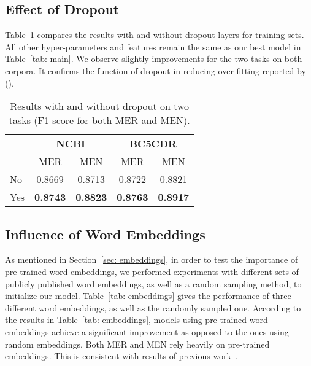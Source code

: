 \subsection{Effect of Dropout}
Table~\ref{tab: dropout} compares the results with and without dropout layers for training sets. All other
hyper-parameters and features remain the same as our best model in Table~\ref{tab: main}.
We observe slightly improvements for the two
tasks on both corpora. It confirms the function of dropout in reducing over-fitting reported by \citeauthor{Srivastava2014Dropout} (\citeyear{Srivastava2014Dropout}).
\begin{table}[h]
	\small
	\centering
	\begin{tabular}{l|c|c|c|c}
		\hline
		\multirow{2}{*}{}&\multicolumn{2}{c|}{\textbf{NCBI}}&\multicolumn{2}{c}{\textbf{BC5CDR}}\\
		\cline{2-5}
		\multirow{2}{*}{}& MER&MEN&MER&MEN\\
		\hline
		No&0.8669&0.8713&0.8722&0.8821\\
		Yes &\textbf{0.8743}&\textbf{0.8823}&\textbf{0.8763}&\textbf{0.8917}\\
		\hline
	\end{tabular}
	\vspace{-0.1in}
	\caption{Results with and without dropout on two
		tasks (F1 score for both MER and MEN).}\label{tab: dropout}	
	\vspace{-0.2in}
\end{table}

\subsection{Influence of Word Embeddings}
As mentioned in Section~\ref{sec: embeddings}, in order to test the importance of pre-trained word embeddings, we performed experiments with different sets of publicly published word embeddings, as well as a random sampling method, to initialize our model. Table~\ref{tab: embeddings} gives the performance of three different word embeddings, as well as the randomly sampled one.
According to the results in Table~\ref{tab: embeddings}, models using pre-trained word embeddings achieve a significant improvement as opposed to the ones using random embeddings. Both MER and MEN rely heavily on pre-trained embeddings. This is consistent with results of previous work~\cite{HuangXY15,TACL792}.


